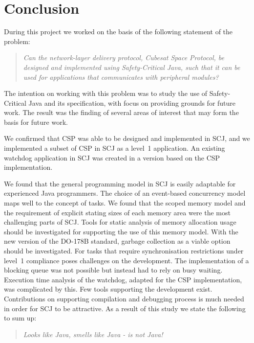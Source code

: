 \chapter{Conclusion}
\label{chapter:Conclusion}
During this project we worked on the basis of the following statement of the problem:
\begin{quotation}
	\textit{Can the network-layer delivery protocol, Cubesat Space Protocol, be designed and implemented using Safety-Critical Java, such that it can be used for applications that communicates with peripheral modules?}
\end{quotation}
The intention on working with this problem was to study the use of Safety-Critical Java and its specification, with focus on providing grounds for future work. The result was the finding of several areas of interest that may form the basis for future work.

We confirmed that CSP was able to be designed and implemented in SCJ, and we implemented a subset of CSP in SCJ as a level~1 application. An existing watchdog application in SCJ was created in a version based on the CSP implementation.

We found that the general programming model in SCJ is easily adaptable for experienced Java programmers. The choice of an event-based concurrency model maps well to the concept of tasks. We found that the scoped memory model and the requirement of explicit stating sizes of each memory area were the most challenging parts of SCJ. Tools for static analysis of memory allocation usage should be investigated for supporting the use of this memory model. With the new version of the DO-178B standard, garbage collection as a viable option should be investigated. For tasks that require synchronisation restrictions under level~1 compliance poses challenges on the development. The implementation of a blocking queue was not possible but instead had to rely on busy waiting. Execution time analysis of the watchdog, adapted for the CSP implementation, was complicated by this. Few tools supporting the development exist. Contributions on supporting compilation and debugging process is much needed in order for SCJ to be attractive. As a result of this study we state the following to sum up: 
\begin{quotation}
\centering
	\textit{Looks like Java, smells like Java - is not Java!}
\end{quotation}